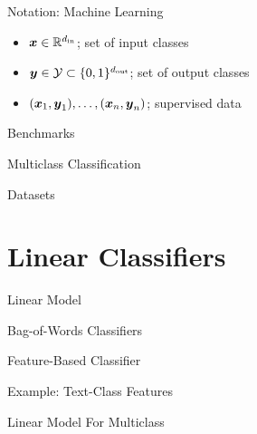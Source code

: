\documentclass{beamer}
\begin{document}
\begin{frame}{Notation: Machine Learning}
  \begin{itemize}
  \item $\boldsymbol{x} \in \mathbb{R}^{d_{\mathrm{in}}}$; set of input classes  
  \item $\boldsymbol{y} \in \mathcal{Y} \subset \{0, 1\}^{d_{\mathrm{out}}}$; set of output classes
  \item $(\boldsymbol{x}_1, \boldsymbol{y}_1), \ldots, (\boldsymbol{x}_n, \boldsymbol{y}_n)$; supervised data
  \end{itemize}


\end{frame}



\begin{frame}{Benchmarks}
  
\end{frame}

\begin{frame}{Multiclass Classification}
  
\end{frame}

\begin{frame}{Datasets}
  
\end{frame}

\section{Linear Classifiers}

\begin{frame}{Linear Model}
  
\end{frame}


\begin{frame}{Bag-of-Words Classifiers}
  
\end{frame}


\begin{frame}{Feature-Based Classifier}
  
\end{frame}


\begin{frame}{Example: Text-Class Features}

\end{frame}


\begin{frame}{Linear Model For Multiclass}  
  \[ \]
\end{frame}
\end{document}
